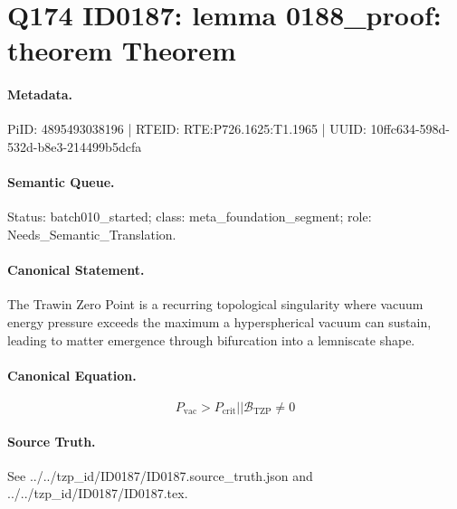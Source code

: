 \section*{Q174 ID0187: lemma 0188\_proof: theorem Theorem}
\paragraph{Metadata.}
PiID: 4895493038196 | RTEID: RTE:P726.1625:T1.1965 | UUID: 10ffc634-598d-532d-b8e3-214499b5dcfa

\paragraph{Semantic Queue.}
Status: batch010\_started; class: meta\_foundation\_segment; role: Needs\_Semantic\_Translation.

\paragraph{Canonical Statement.}
The Trawin Zero Point is a recurring topological singularity where vacuum energy pressure exceeds the maximum a hyperspherical vacuum can sustain, leading to matter emergence through bifurcation into a lemniscate shape.

\paragraph{Canonical Equation.}
\[
P_{\mathrm{vac}} > P_{\mathrm{crit}} || \mathcal{B}_{\mathrm{TZP}} \neq 0
\]

\paragraph{Source Truth.}
See ../../tzp\_id/ID0187/ID0187.source\_truth.json and ../../tzp\_id/ID0187/ID0187.tex.
